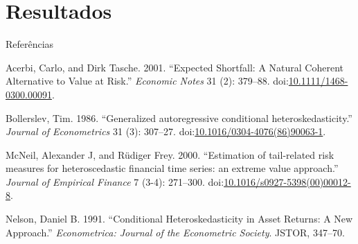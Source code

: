 \documentclass[ignorenonframetext,]{beamer}
\begin{document}
\section{Resultados}\label{resultados}

\begin{frame}{Referências}

\hypertarget{refs}{}
\hypertarget{ref-Acerbi2001}{}
Acerbi, Carlo, and Dirk Tasche. 2001. ``Expected Shortfall: A Natural
Coherent Alternative to Value at Risk.'' \emph{Economic Notes} 31 (2):
379--88.
doi:\href{https://doi.org/10.1111/1468-0300.00091}{10.1111/1468-0300.00091}.

\hypertarget{ref-Bollerslev1986}{}
Bollerslev, Tim. 1986. ``Generalized autoregressive conditional
heteroskedasticity.'' \emph{Journal of Econometrics} 31 (3): 307--27.
doi:\href{https://doi.org/10.1016/0304-4076(86)90063-1}{10.1016/0304-4076(86)90063-1}.

\hypertarget{ref-McNeil2000}{}
McNeil, Alexander J, and Rüdiger Frey. 2000. ``Estimation of
tail-related risk measures for heteroscedastic financial time series: an
extreme value approach.'' \emph{Journal of Empirical Finance} 7 (3-4):
271--300.
doi:\href{https://doi.org/10.1016/s0927-5398(00)00012-8}{10.1016/s0927-5398(00)00012-8}.

\hypertarget{ref-Nelson1991}{}
Nelson, Daniel B. 1991. ``Conditional Heteroskedasticity in Asset
Returns: A New Approach.'' \emph{Econometrica: Journal of the
Econometric Society}. JSTOR, 347--70.

\end{frame}
\end{document}
